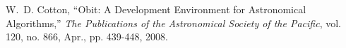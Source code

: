 \documentclass[10pt,onecolumn,final]{IEEEtran}
\begin{document}
\ifCLASSOPTIONcaptionsoff
  \newpage
\fi





%
%
%
\begin{thebibliography}{1}

W.~D. Cotton, ``Obit: A Development Environment for Astronomical Algorithms,'' \emph{The Publications of the Astronomical Society of the Pacific}, vol. 120, no. 866, Apr., pp. 439-448, 2008.


\end{thebibliography}

% 

\end{document}
